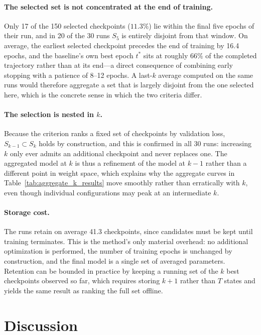 \documentclass[runningheads]{llncs}
\begin{document}
\paragraph{The selected set is not concentrated at the end of training.}
Only 17 of the 150 selected checkpoints ($11.3\%$) lie within the final five
epochs of their run, and in 20 of the 30 runs $S_5$ is entirely disjoint from
that window. On average, the earliest selected checkpoint precedes the end of
training by 16.4 epochs, and the baseline's own best epoch $t^{*}$ sits at
roughly $66\%$ of the completed trajectory rather than at its end---a direct
consequence of combining early stopping with a patience of 8--12 epochs. A
last-$k$ average computed on the same runs would therefore aggregate a set
that is largely disjoint from the one selected here, which is the concrete
sense in which the two criteria differ.

\paragraph{The selection is nested in $k$.}
Because the criterion ranks a fixed set of checkpoints by validation loss,
$S_{k-1}\subset S_k$ holds by construction, and this is confirmed in all 30
runs: increasing $k$ only ever admits an additional checkpoint and never
replaces one. The aggregated model at $k$ is thus a refinement of the model at
$k-1$ rather than a different point in weight space, which explains why the
aggregate curves in Table~\ref{tab:aggregate_k_results} move smoothly rather
than erratically with $k$, even though individual configurations may peak at
an intermediate $k$.

\paragraph{Storage cost.}
The runs retain on average 41.3 checkpoints, since candidates must be kept
until training terminates. This is the method's only material overhead: no
additional optimization is performed, the number of training epochs is
unchanged by construction, and the final model is a single set of averaged
parameters. Retention can be bounded in practice by keeping a running set of
the $k$ best checkpoints observed so far, which requires storing $k+1$ rather
than $T$ states and yields the same result as ranking the full set offline.

\FloatBarrier
\section{Discussion}
\label{sec:discussion}
\end{document}
